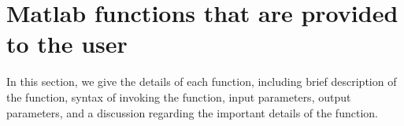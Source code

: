 \documentclass[10pt]{acmtrans2e}
\newcommand{\Matlab}{\textsc{Matlab}}
\newcommand{\function}[1]{\textbf{\texttt{#1}}}
\newcommand{\parameter}[1]{\texttt{#1}}
\begin{document}



\section{Matlab functions that are provided to the user}\label{sec:functions}
In this section, we give the details of each function, including brief description of the function, syntax of invoking the function, input parameters, output parameters, and a discussion regarding the important details of the function.
\end{document}
